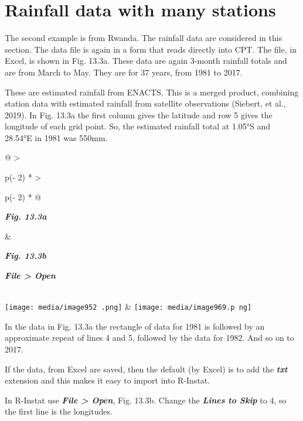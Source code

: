 \documentclass[
  letterpaper,
  DIV=11,
  numbers=noendperiod]{scrreprt}
\begin{document}
\section{Rainfall data with many
stations}\label{rainfall-data-with-many-stations}

The second example is from Rwanda. The rainfall data are considered in
this section. The data file is again in a form that reads directly into
CPT. The file, in Excel, is shown in Fig. 13.3a. These data are again
3-month rainfall totals and are from March to May. They are for 37
years, from 1981 to 2017.

These are estimated rainfall from ENACTS. This is a merged product,
combining station data with estimated rainfall from satellite
observations (Siebert, et al., 2019). In Fig. 13.3a the first column
gives the latitude and row 5 gives the longitude of each grid point. So,
the estimated rainfall total at 1.05°S and 28.54°E in 1981 was 550mm.

\begin{longtable}[]{@{}
  >{\raggedright\arraybackslash}p{(\columnwidth - 2\tabcolsep) * }
  >{\raggedright\arraybackslash}p{(\columnwidth - 2\tabcolsep) * }@{}}
\toprule\noalign{}
\begin{minipage}[b]{\linewidth}\raggedright
\textbf{\emph{Fig. 13.3a}}
\end{minipage} & \begin{minipage}[b]{\linewidth}\raggedright
\textbf{\emph{Fig. 13.3b}}

\textbf{\emph{File \textgreater{} Open}}
\end{minipage} \\
\midrule\noalign{}
\endhead
\bottomrule\noalign{}
\endlastfoot
\texttt{[image: media/image952 .png]}
&
\texttt{[image: media/image969.p ng]} \\
\end{longtable}

In the data in Fig. 13.3a the rectangle of data for 1981 is followed by
an approximate repeat of lines 4 and 5, followed by the data for 1982.
And so on to 2017.

If the data, from Excel are saved, then the default (by Excel) is to add
the \textbf{\emph{txt}} extension and this makes it easy to import into
R-Instat.

In R-Instat use \textbf{\emph{File \textgreater{} Open}}, Fig. 13.3b.
Change the \textbf{\emph{Lines to Skip}} to 4, so the first line is the
longitudes.
\end{document}

